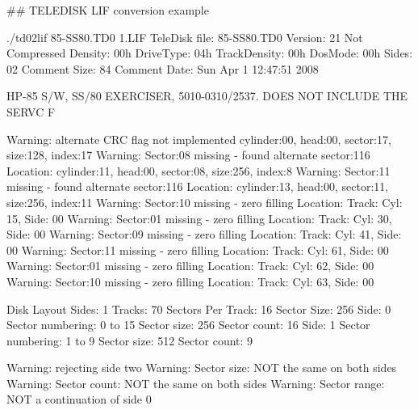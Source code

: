 \#\# T\+E\+L\+E\+D\+I\+SK L\+IF conversion example 
\begin{DoxyPre}
./td02lif 85-SS80.TD0 1.LIF
TeleDisk file:         85-SS80.TD0
        Version:       21
        Not Compressed
        Density:       00h
        DriveType:     04h
        TrackDensity:  00h
        DosMode:       00h
        Sides:         02
        Comment Size:  84
        Comment Date:  Sun Apr  1 12:47:51 2008\end{DoxyPre}



\begin{DoxyPre}HP-85 S/W, SS/80 EXERCISER, 5010-0310/2537. DOES NOT INCLUDE THE SERVC F\end{DoxyPre}



\begin{DoxyPre}Warning: alternate CRC flag not implemented
        cylinder:00, head:00, sector:17, size:128, index:17
Warning: Sector:08 missing - found alternate sector:116
         Location: cylinder:11, head:00, sector:08, size:256, index:8
Warning: Sector:11 missing - found alternate sector:116
         Location: cylinder:13, head:00, sector:11, size:256, index:11
Warning: Sector:10 missing - zero filling
         Location: Track: Cyl: 15, Side: 00
Warning: Sector:01 missing - zero filling
         Location: Track: Cyl: 30, Side: 00
Warning: Sector:09 missing - zero filling
         Location: Track: Cyl: 41, Side: 00
Warning: Sector:11 missing - zero filling
         Location: Track: Cyl: 61, Side: 00
Warning: Sector:01 missing - zero filling
         Location: Track: Cyl: 62, Side: 00
Warning: Sector:10 missing - zero filling
         Location: Track: Cyl: 63, Side: 00\end{DoxyPre}



\begin{DoxyPre}Disk Layout
         Sides:              1
         Tracks:            70
         Sectors Per Track: 16
         Sector Size:      256
Side: 0
         Sector numbering:  0 to 15
         Sector size:     256
         Sector count:     16
Side: 1
         Sector numbering:  1 to  9
         Sector size:     512
         Sector count:      9\end{DoxyPre}



\begin{DoxyPre}Warning: rejecting side two
         Warning: Sector size:  NOT the same on both sides
         Warning: Sector count: NOT the same on both sides
         Warning: Sector range: NOT a continuation of side 0\end{DoxyPre}



